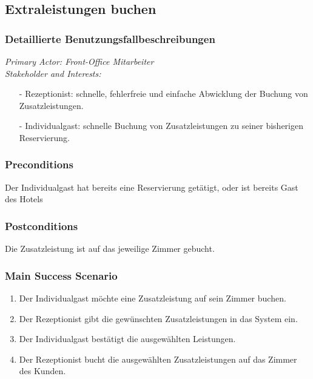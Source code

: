 \documentclass[./detailed_overview_usecases.tex]{subfiles}
\begin{document}
    \subsection{Extraleistungen buchen}
    \subsubsection{Detaillierte Benutzungsfallbeschreibungen}
    \textit{Primary Actor: Front-Office Mitarbeiter}
    \\
    \textit{Stakeholder and Interests:}
    \begin{itemize}
        \item[-] Rezeptionist: schnelle, fehlerfreie und einfache Abwicklung der Buchung von Zusatzleistungen.
        \item[-] Individualgast: schnelle Buchung von Zusatzleistungen zu seiner bisherigen Reservierung.
    \end{itemize}

    \subsubsection*{Preconditions}
    Der Individualgast hat bereits eine Reservierung getätigt, oder ist bereits Gast des Hotels
    \subsubsection*{Postconditions}
    Die Zusatzleistung ist auf das jeweilige Zimmer gebucht.

    \subsubsection*{Main Success Scenario}
    \begin{enumerate}
        \item Der Individualgast möchte eine Zusatzleistung auf sein Zimmer buchen.
        \item Der Rezeptionist gibt die gewünschten Zusatzleistungen in das System ein.
        \item Der Individualgast bestätigt die ausgewählten Leistungen.
        \item Der Rezeptionist bucht die ausgewählten Zusatzleistungen auf das Zimmer des Kunden.
    \end{enumerate}
\end{document}
